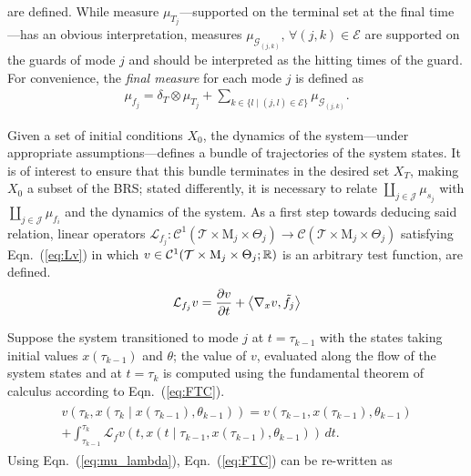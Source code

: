 are defined. While measure $\mu_{T_j}$---supported on the terminal set at the final time---has an obvious interpretation, measures $\mu_{\mathcal G_{(j,k)}},\,\forall (j,k)\in \mathcal E$ are supported on the guards of mode $j$ and should be interpreted as the hitting times of the guard.
For convenience, the {\em final measure} for each mode $j$ is defined as
\begin{align}
  \mu_{f_j}=\delta_T\otimes \mu_{T_j}+\sum_{k\in\{l\mid (j,l)\in \mathcal E\}}\mu_{\mathcal G_{(j,k)}}.
\label{eq:mu_T}
\end{align}
\normalsize
\par
Given a set of initial conditions $X_{0}$, the dynamics of the system---under appropriate assumptions---defines a bundle of trajectories of the system states. It is of interest to ensure that this bundle terminates in the desired set $X_T$, making $X_0$ a subset of the BRS; stated differently, it is necessary to relate $\coprod_{j\in \mathcal J}\mu_{s_j}$ with $\coprod_{j\in \mathcal J}\mu_{f_i}$ and the dynamics of the system. As a first step towards deducing said relation, linear operators {$\mathcal L_{ f_j}\colon \mathcal C^1(\mathcal T\times \mathrm M_j\times \Theta_j)\rightarrow \mathcal C(\mathcal T\times \mathrm M_j\times \Theta_j)$} satisfying Eqn.~(\ref{eq:Lv}) in which $v\in \mathcal C^1(\mathcal T\times \mathrm M_j\times \Theta_j;\mathbb{R})$ is an arbitrary test function, are defined.
\begin{align}
      \mathcal L_{f_j}v=\frac{\partial v}{\partial t}+\left\langle \nabla_x v,\tilde f_j\right\rangle
    \label{eq:Lv}
\end{align}
\par
Suppose the system transitioned to mode $j$ at \mbox{$t=\tau_{k-1}$} with the states taking initial values $x(\tau_{k-1})$ and $\theta$; the value of $v$, evaluated along the flow of the system states and at $t=\tau_{k}$ is computed using the fundamental theorem of calculus according to Eqn.~(\ref{eq:FTC}).
\begin{align}
\begin{split}
    v\left(\tau_k,x\left(\tau_{k}\mid x(\tau_{k-1}),\theta_{k-1}\right)\right)=v(\tau_{k-1},x(\tau_{k-1}),\theta_{k-1})\\
    +\int_{\tau_{k-1}}^{\tau_{k}}\mathcal L_{f}v(t,x(t\mid \tau_{k-1},x(\tau_{k-1}),\theta_{k-1}))\,dt.
\end{split}
\label{eq:FTC}
\end{align}
Using Eqn.~(\ref{eq:mu_lambda}), Eqn.~(\ref{eq:FTC}) can be re-written as

